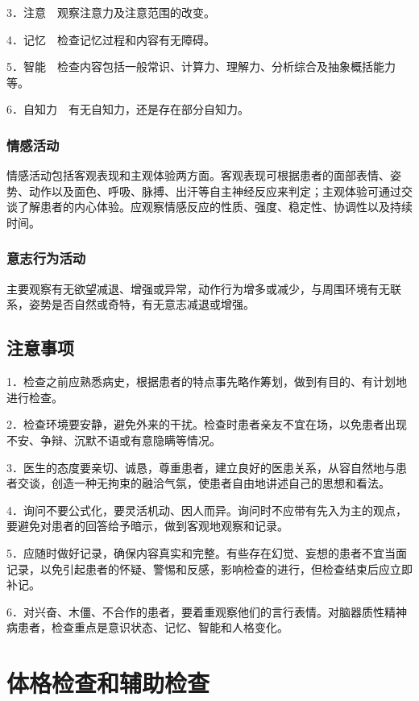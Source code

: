 3．注意　观察注意力及注意范围的改变。

4．记忆　检查记忆过程和内容有无障碍。

5．智能　检查内容包括一般常识、计算力、理解力、分析综合及抽象概括能力等。

6．自知力　有无自知力，还是存在部分自知力。

\subsubsection{情感活动}

情感活动包括客观表现和主观体验两方面。客观表现可根据患者的面部表情、姿势、动作以及面色、呼吸、脉搏、出汗等自主神经反应来判定；主观体验可通过交谈了解患者的内心体验。应观察情感反应的性质、强度、稳定性、协调性以及持续时间。

\subsubsection{意志行为活动}

主要观察有无欲望减退、增强或异常，动作行为增多或减少，与周围环境有无联系，姿势是否自然或奇特，有无意志减退或增强。

\subsection{注意事项}

1．检查之前应熟悉病史，根据患者的特点事先略作筹划，做到有目的、有计划地进行检查。

2．检查环境要安静，避免外来的干扰。检查时患者亲友不宜在场，以免患者出现不安、争辩、沉默不语或有意隐瞒等情况。

3．医生的态度要亲切、诚恳，尊重患者，建立良好的医患关系，从容自然地与患者交谈，创造一种无拘束的融洽气氛，使患者自由地讲述自己的思想和看法。

4．询问不要公式化，要灵活机动、因人而异。询问时不应带有先入为主的观点，要避免对患者的回答给予暗示，做到客观地观察和记录。

5．应随时做好记录，确保内容真实和完整。有些存在幻觉、妄想的患者不宜当面记录，以免引起患者的怀疑、警惕和反感，影响检查的进行，但检查结束后应立即补记。

6．对兴奋、木僵、不合作的患者，要着重观察他们的言行表情。对脑器质性精神病患者，检查重点是意识状态、记忆、智能和人格变化。

\section{体格检查和辅助检查}

